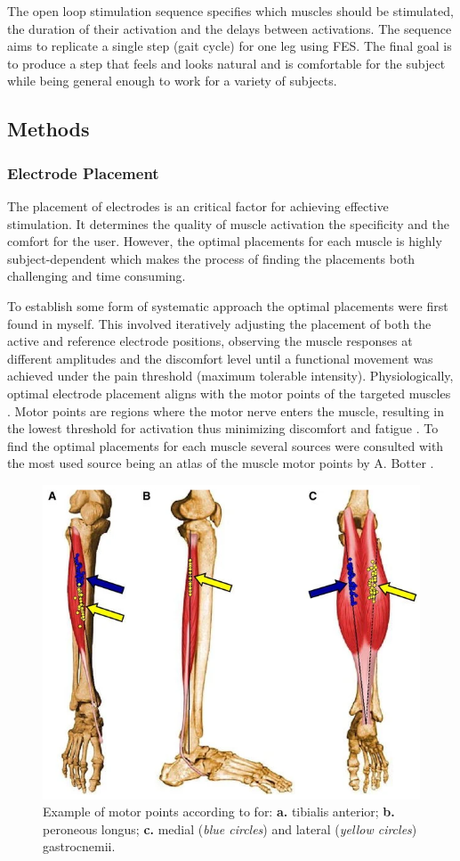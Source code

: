 
The open loop stimulation sequence specifies which muscles should be stimulated, the duration of their activation and the delays between activations. The sequence aims to replicate a single step (gait cycle) for one leg using FES. The final goal is to produce a step that feels and looks natural and is comfortable for the subject while being general enough to work for a variety of subjects.

\subsection{Methods}
\subsubsection{Electrode Placement}
The placement of electrodes is an critical factor for achieving effective stimulation. It determines the quality of muscle activation the specificity and the comfort for the user. However, the optimal placements for each muscle is highly subject-dependent  which makes the process of finding the placements both challenging and time consuming.

To establish some form of systematic approach the optimal placements were first found in myself. This involved iteratively adjusting the placement of both the active and reference electrode positions, observing the muscle responses at different amplitudes and the discomfort level until a functional movement was achieved under the pain threshold (maximum tolerable intensity). Physiologically, optimal electrode placement aligns with the motor points of the targeted muscles \cite{gobbo_muscle_2014}. Motor points are regions where the motor nerve enters the muscle, resulting in the lowest threshold for activation thus minimizing discomfort and fatigue \cite{gobbo_muscle_2014}. To find the optimal placements for each muscle several sources were consulted with the most used source being an atlas of the muscle motor points by A. Botter \cite{botter_atlas_2011}. 

\begin{figure}
    \centering
    \includegraphics[width=0.6\linewidth]{images/screenshotmotorpoint.png}
    \caption{Example of motor points according to \cite{botter_atlas_2011} for: \textbf{a.} tibialis anterior; \textbf{b.} peroneous longus; \textbf{c.} medial (\textit{blue circles}) and lateral (\textit{yellow circles}) gastrocnemii. }
    \label{fig:motor-points}
\end{figure}

